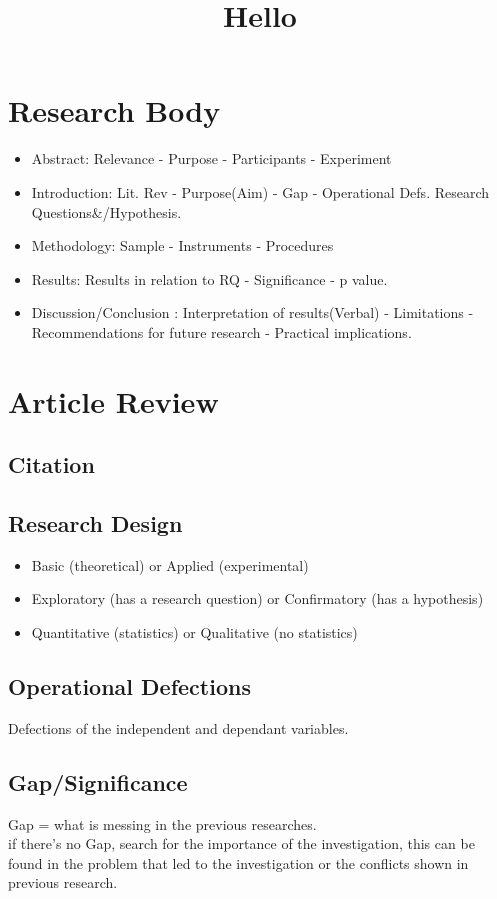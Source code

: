 \documentclass[11pt]{article}
\begin{document}
\setcounter{section}{0}
\title{Hello}
\section{Research Body}
\begin{itemize}

\item Abstract: Relevance - Purpose - Participants - Experiment 
\item Introduction: Lit. Rev - Purpose(Aim) - Gap - Operational Defs. Research Questions\&/Hypothesis. 
\item Methodology: Sample - Instruments - Procedures 
\item Results: Results in relation to  RQ - Significance - p value.
\item Discussion/Conclusion : Interpretation of results(Verbal) - Limitations - Recommendations for future research - Practical implications.
\end{itemize}

\section{Article Review}
\subsection{Citation}

\subsection{Research Design}
\begin{itemize}

	\item Basic (theoretical) or Applied (experimental)
	\item Exploratory (has a research question) or Confirmatory (has a hypothesis)
	\item Quantitative (statistics) or Qualitative (no statistics)

\end{itemize}
\subsection{Operational Defections}
Defections of the independent  and dependant variables.
\subsection{Gap/Significance}
Gap = what is messing in the previous researches.\\
if there's no Gap, search for the importance of the investigation, this can be found in the problem that led to the investigation or the conflicts shown in previous research.
\end{document}
